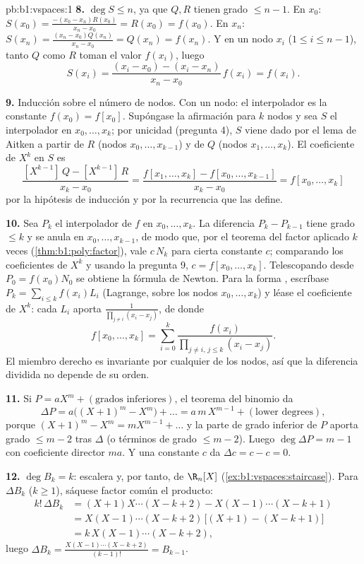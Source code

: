 \begin{solution}{pb:b1:vspaces:1}
\textbf{8.} $\deg S \leq n$, ya que $Q, R$ tienen grado $\leq n - 1$.
En $x_0$: $S(x_0) = \frac{-(x_0 - x_n) R(x_0)}{x_n - x_0} =
R(x_0) = f(x_0)$. En $x_n$:
$S(x_n) = \frac{(x_n - x_0) Q(x_n)}{x_n - x_0} = Q(x_n) = f(x_n)$. Y
en un nodo  $x_i$ ($1 \leq i \leq n-1$), tanto $Q$ como $R$
toman el valor $f(x_i)$, luego
\[
S(x_i) = \frac{(x_i - x_0) - (x_i - x_n)}{x_n - x_0}\, f(x_i)
= f(x_i) .
\]

\textbf{9.} Inducción sobre el número de nodos. Con un nodo: el
interpolador es la constante $f(x_0) = f[x_0]$. Supóngase la
afirmación para $k$ nodos y sea $S$ el interpolador en
$x_0, \dots, x_k$; por unicidad (pregunta 4), $S$ viene dado por el
lema de Aitken a partir de $R$ (nodos $x_0, \dots, x_{k-1}$) y de $Q$
(nodos $x_1, \dots, x_k$). El coeficiente de $X^{k}$ en $S$ es
\[
\frac{[X^{k-1}]\,Q - [X^{k-1}]\,R}{x_k - x_0}
= \frac{f[x_1, \dots, x_k] - f[x_0, \dots, x_{k-1}]}{x_k - x_0}
= f[x_0, \dots, x_k]
\]
por la hipótesis de inducción y por la recurrencia que las define.

\textbf{10.} Sea $P_k$ el interpolador de $f$ en $x_0, \dots, x_k$.
La diferencia $P_k - P_{k-1}$ tiene grado $\leq k$ y se anula en
$x_0, \dots, x_{k-1}$, de modo que, por el teorema del factor
aplicado $k$ veces (\cref{thm:b1:poly:factor}), vale $c\,N_k$ para
cierta constante $c$; comparando los coeficientes de $X^{k}$ y
usando la pregunta 9, $c = f[x_0, \dots, x_k]$. Telescopando desde
$P_0 = f(x_0) N_0$ se obtiene la fórmula de Newton. Para la forma
, escríbase $P_k = \sum_{i \leq k} f(x_i) L_i$ (Lagrange,
sobre los nodos $x_0, \dots, x_k$) y léase el coeficiente de
$X^{k}$: cada $L_i$ aporta $\frac{1}{\prod_{j \neq i}(x_i - x_j)}$,
de donde
\[
f[x_0, \dots, x_k] = \sum_{i=0}^{k}
\frac{f(x_i)}{\prod_{j \neq i,\, j \leq k}(x_i - x_j)} .
\]
El miembro derecho es invariante por cualquier  de los
nodos, así que la diferencia dividida no depende de su orden.

\textbf{11.} Si $P = a X^m + (\text{grados inferiores})$, el teorema
del binomio da
\[
\Delta P = a\bigl((X+1)^m - X^m\bigr) + \dots
= a\,m\,X^{m-1} + (\text{lower degrees}),
\]
porque $(X+1)^m - X^m = m X^{m-1} + \dots$ y la parte de grado
inferior de $P$ aporta grado $\leq m - 2$ tras $\Delta$ (o términos
de grado $\leq m-2$). Luego $\deg \Delta P = m - 1$ con coeficiente
director $m a$. Y una constante $c$ da $\Delta c = c - c = 0$.

\textbf{12.} $\deg B_k = k$: escalera y, por tanto,  de
$\R_n[X]$ (\cref{ex:b1:vspaces:staircase}). Para $\Delta B_k$
($k \geq 1$), sáquese factor común el producto:
\begin{align*}
k!\,\Delta B_k
&= (X+1)X\cdots(X-k+2) - X(X-1)\cdots(X-k+1) \\
&= X(X-1)\cdots(X-k+2)\,\bigl[(X+1) - (X-k+1)\bigr] \\
&= k\,X(X-1)\cdots(X-k+2),
\end{align*}
luego $\Delta B_k = \frac{X(X-1)\cdots(X-k+2)}{(k-1)!} = B_{k-1}$.


\end{solution}
